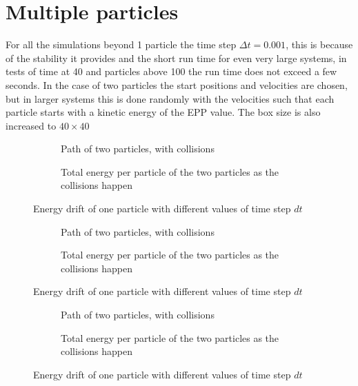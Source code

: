 \documentclass[10pt,a4paper,aps,twocolumn,secnumarabic,numerical,balancelastpage,nofootinbib,superscriptaddress]{revtex4-2}
\begin{document}
	\section{Multiple particles}
	
		For all the simulations beyond 1 particle the time step $\Delta t =0.001$, this is because of the stability it provides and the short run time for even very large systems, in tests of time at 40 and particles above 100 the run time does not exceed a few seconds. In the case of two particles the start positions and velocities are chosen, but in larger systems this is done randomly with the velocities such that each particle starts with a kinetic energy of the EPP value. The box size is also increased to $40\times40$
		\begin{figure*}[htb]
			\centering
			\begin{subfigure}{.45\textwidth}
				\hspace*{-2cm}\scalebox{0.8}{}
				\caption{Path of two particles, with collisions}
			\end{subfigure}
			\begin{subfigure}{.45\textwidth}
				\scalebox{0.6}{}
				\caption{Total energy per particle of the two particles as the collisions happen}
			\end{subfigure}
			\caption{Energy drift of one particle with different values of time step $dt$}
		\end{figure*}
		
		\begin{figure*}[htb]
			\centering
			\begin{subfigure}{.45\textwidth}
				\hspace*{-2cm}\scalebox{0.8}{}
				\caption{Path of two particles, with collisions}
			\end{subfigure}
			\begin{subfigure}{.45\textwidth}
				\scalebox{0.6}{}
				\caption{Total energy per particle of the two particles as the collisions happen}
			\end{subfigure}
			\caption{Energy drift of one particle with different values of time step $dt$}
		\end{figure*}
		
		\begin{figure*}[htb]
			\centering
			\begin{subfigure}{.45\textwidth}
				\hspace*{-2cm}\scalebox{0.8}{}
				\caption{Path of two particles, with collisions}
			\end{subfigure}
			\begin{subfigure}{.45\textwidth}
				\scalebox{0.6}{}
				\caption{Total energy per particle of the two particles as the collisions happen}
			\end{subfigure}
			\caption{Energy drift of one particle with different values of time step $dt$}
		\end{figure*}
		
\end{document}
